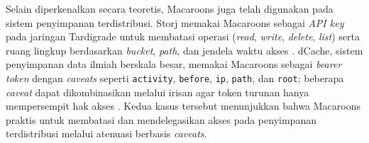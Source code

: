 Selain diperkenalkan secara teoretis, Macaroons juga telah digunakan pada sistem penyimpanan terdistribusi. Storj memakai Macaroons sebagai \textit{API key} pada jaringan Tardigrade untuk membatasi operasi (\textit{read}, \textit{write}, \textit{delete}, \textit{list}) serta ruang lingkup berdasarkan \textit{bucket}, \textit{path}, dan jendela waktu akses \autocite{storj_macaroons}. dCache, sistem penyimpanan data ilmiah berskala besar, memakai Macaroons sebagai \textit{bearer token} dengan \textit{caveats} seperti \texttt{activity}, \texttt{before}, \texttt{ip}, \texttt{path}, dan \texttt{root}; beberapa \textit{caveat} dapat dikombinasikan melalui irisan agar token turunan hanya mempersempit hak akses \autocite{dcache_macaroons}. Kedua kasus tersebut menunjukkan bahwa Macaroons praktis untuk membatasi dan mendelegasikan akses pada penyimpanan terdistribusi melalui atenuasi berbasis \textit{caveats}.
